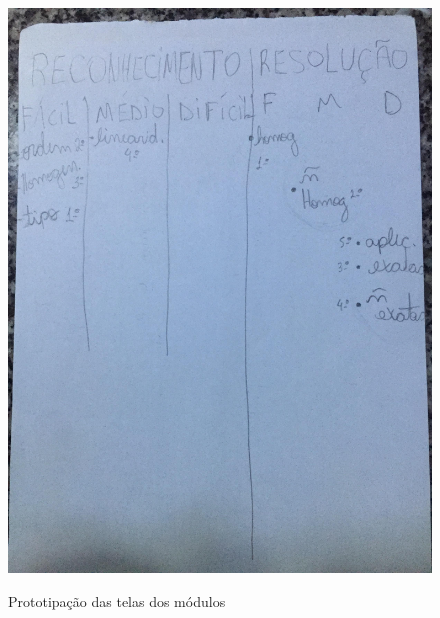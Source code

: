 \begin{figure}[H]
\centering
\caption{Prototipação das telas dos módulos}
\includegraphics[scale=0.13]{figuras/prot1.jpg}
\label{prot1}
\end{figure}
